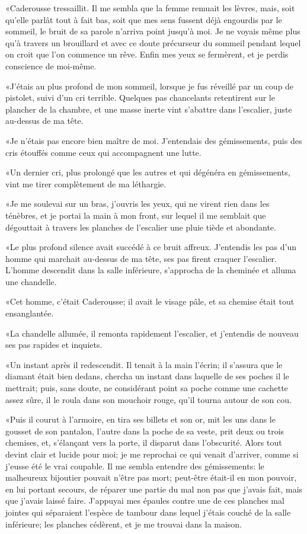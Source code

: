 «Caderousse tressaillit. Il me sembla que la femme remuait les lèvres, mais, soit qu'elle parlât tout à fait bas, soit que mes sens fussent déjà engourdis par le sommeil, le bruit de sa parole n'arriva point jusqu'à moi. Je ne voyais même plus qu'à travers un brouillard et avec ce doute précurseur du sommeil pendant lequel on croit que l'on commence un rêve. Enfin mes yeux se fermèrent, et je perdis conscience de moi-même. 

«J'étais au plus profond de mon sommeil, lorsque je fus réveillé par un coup de pistolet, suivi d'un cri terrible. Quelques pas chancelants retentirent sur le plancher de la chambre, et une masse inerte vint s'abattre dans l'escalier, juste au-dessus de ma tête. 

«Je n'étais pas encore bien maître de moi. J'entendais des gémissements, puis des cris étouffés comme ceux qui accompagnent une lutte. 

«Un dernier cri, plus prolongé que les autres et qui dégénéra en gémissements, vint me tirer complètement de ma léthargie. 

«Je me soulevai sur un bras, j'ouvris les yeux, qui ne virent rien dans les ténèbres, et je portai la main à mon front, sur lequel il me semblait que dégouttait à travers les planches de l'escalier une pluie tiède et abondante. 

«Le plus profond silence avait succédé à ce bruit affreux. J'entendis les pas d'un homme qui marchait au-dessus de ma tête, ses pas firent craquer l'escalier. L'homme descendit dans la salle inférieure, s'approcha de la cheminée et alluma une chandelle. 

«Cet homme, c'était Caderousse; il avait le visage pâle, et sa chemise était tout ensanglantée. 

«La chandelle allumée, il remonta rapidement l'escalier, et j'entendis de nouveau ses pas rapides et inquiets. 

«Un instant après il redescendit. Il tenait à la main l'écrin; il s'assura que le diamant était bien dedans, chercha un instant dans laquelle de ses poches il le mettrait; puis, sans doute, ne considérant point sa poche comme une cachette assez sûre, il le roula dans son mouchoir rouge, qu'il tourna autour de son cou. 

«Puis il courut à l'armoire, en tira ses billets et son or, mit les uns dans le gousset de son pantalon, l'autre dans la poche de sa veste, prit deux ou trois chemises, et, s'élançant vers la porte, il disparut dans l'obscurité. Alors tout devint clair et lucide pour moi; je me reprochai ce qui venait d'arriver, comme si j'eusse été le vrai coupable. Il me sembla entendre des gémissements: le malheureux bijoutier pouvait n'être pas mort; peut-être était-il en mon pouvoir, en lui portant secours, de réparer une partie du mal non pas que j'avais fait, mais que j'avais laissé faire. J'appuyai mes épaules contre une de ces planches mal jointes qui séparaient l'espèce de tambour dans lequel j'étais couché de la salle inférieure; les planches cédèrent, et je me trouvai dans la maison. 

